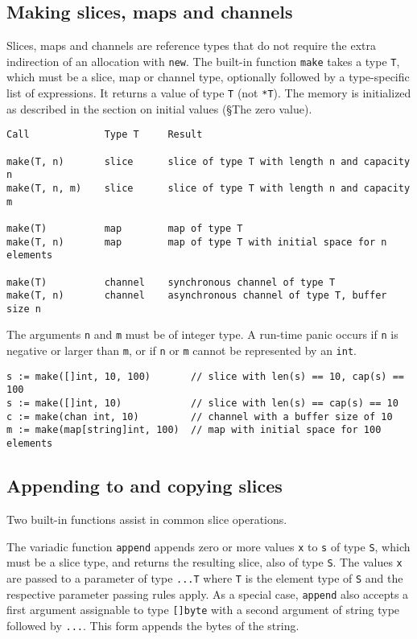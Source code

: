 \subsection*{Making slices, maps and channels}

Slices, maps and channels are reference types that do not require the
extra indirection of an allocation with \texttt{new}. The built-in
function \texttt{make} takes a type \texttt{T}, which must be a slice,
map or channel type, optionally followed by a type-specific list of
expressions. It returns a value of type \texttt{T} (not \texttt{*T}).
The memory is initialized as described in the section on initial values
(§The zero value).

\begin{Verbatim}[frame=single]
Call             Type T     Result

make(T, n)       slice      slice of type T with length n and capacity n
make(T, n, m)    slice      slice of type T with length n and capacity m

make(T)          map        map of type T
make(T, n)       map        map of type T with initial space for n elements

make(T)          channel    synchronous channel of type T
make(T, n)       channel    asynchronous channel of type T, buffer size n
\end{Verbatim}

The arguments \texttt{n} and \texttt{m} must be of integer type. A
run-time panic occurs if \texttt{n} is
negative or larger than \texttt{m}, or if \texttt{n} or \texttt{m}
cannot be represented by an \texttt{int}.

\begin{Verbatim}[frame=single]
s := make([]int, 10, 100)       // slice with len(s) == 10, cap(s) == 100
s := make([]int, 10)            // slice with len(s) == cap(s) == 10
c := make(chan int, 10)         // channel with a buffer size of 10
m := make(map[string]int, 100)  // map with initial space for 100 elements
\end{Verbatim}

\subsection*{Appending to and copying slices}

Two built-in functions assist in common slice operations.

The variadic function \texttt{append} appends zero or more values
\texttt{x} to \texttt{s} of type \texttt{S}, which must be a slice
type, and returns the resulting slice, also of type \texttt{S}. The
values \texttt{x} are passed to a parameter of type \texttt{...T}
where \texttt{T} is the element type of \texttt{S} and the respective
parameter passing rules apply. As a special case, \texttt{append}
also accepts a first argument assignable to type \texttt{{[}{]}byte}
with a second argument of string type followed by \texttt{...}.
This form appends the bytes of the string.

